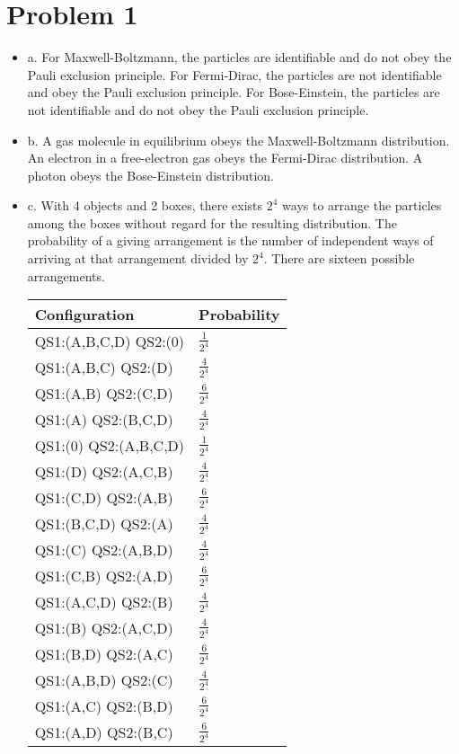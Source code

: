 \documentclass{article}
\numberwithin{equation}{section}
\begin{document}
\section*{Problem 1}

\begin{itemize}
\item a. For Maxwell-Boltzmann, the particles are identifiable and do not obey the Pauli exclusion principle. For Fermi-Dirac, the particles are not identifiable and obey the Pauli exclusion principle. For Bose-Einstein, the particles are not identifiable and do not obey the Pauli exclusion principle.

\item b. A gas molecule in equilibrium obeys the Maxwell-Boltzmann distribution. An electron in a free-electron gas obeys the Fermi-Dirac distribution. A photon obeys the Bose-Einstein distribution.

\item c. With 4 objects and 2 boxes, there exists $2^4$ ways to arrange the particles among the boxes without regard for the resulting distribution. The probability of a giving arrangement is the number of independent ways of arriving at that arrangement divided by $2^4$. There are sixteen possible arrangements.
\newline
\begin{tabular}{|l|l|}
\hline
Configuration & Probability\\ \hline
QS1:(A,B,C,D) QS2:(0) & $\frac{1}{2^4}$ \\ \hline
QS1:(A,B,C) QS2:(D) & $\frac{4}{2^4}$ \\ \hline
QS1:(A,B) QS2:(C,D) & $\frac{6}{2^4}$ \\ \hline
QS1:(A) QS2:(B,C,D) & $\frac{4}{2^4}$ \\ \hline
QS1:(0) QS2:(A,B,C,D) & $\frac{1}{2^4}$\\ \hline
QS1:(D) QS2:(A,C,B) & $\frac{4}{2^4}$ \\ \hline
QS1:(C,D) QS2:(A,B) & $\frac{6}{2^4}$ \\ \hline
QS1:(B,C,D) QS2:(A) & $\frac{4}{2^4}$ \\ \hline
QS1:(C) QS2:(A,B,D) & $\frac{4}{2^4}$ \\ \hline
QS1:(C,B) QS2:(A,D) & $\frac{6}{2^4}$ \\ \hline
QS1:(A,C,D) QS2:(B) & $\frac{4}{2^4}$ \\ \hline
QS1:(B) QS2:(A,C,D) & $\frac{4}{2^4}$ \\ \hline
QS1:(B,D) QS2:(A,C) & $\frac{6}{2^4}$ \\ \hline
QS1:(A,B,D) QS2:(C) & $\frac{4}{2^4}$ \\ \hline
QS1:(A,C) QS2:(B,D) & $\frac{6}{2^4}$ \\ \hline
QS1:(A,D) QS2:(B,C) & $\frac{6}{2^4}$ \\ \hline
\end{tabular}
\end{itemize}
\end{document}
